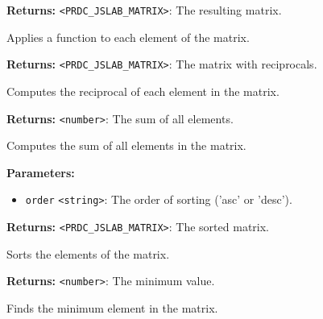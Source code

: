 \documentclass[12pt,a4paper]{article}
\begin{document}
\noindent \textbf{Returns:} \texttt{<PRDC\_JSLAB\_MATRIX>}: The resulting matrix.

\noindent Applies a function to each element of the matrix.

\vspace{5mm}
\noindent {}


\noindent \textbf{Returns:} \texttt{<PRDC\_JSLAB\_MATRIX>}: The matrix with reciprocals.

\noindent Computes the reciprocal of each element in the matrix.

\vspace{5mm}
\noindent {}


\noindent \textbf{Returns:} \texttt{<number>}: The sum of all elements.

\noindent Computes the sum of all elements in the matrix.

\vspace{5mm}
\noindent {}


\noindent \textbf{Parameters:}
\begin{itemize}
  \item \texttt{order} \texttt{<string>}: The order of sorting ('asc' or 'desc').
\end{itemize}

\noindent \textbf{Returns:} \texttt{<PRDC\_JSLAB\_MATRIX>}: The sorted matrix.

\noindent Sorts the elements of the matrix.

\vspace{5mm}
\noindent {}


\noindent \textbf{Returns:} \texttt{<number>}: The minimum value.

\noindent Finds the minimum element in the matrix.

\vspace{5mm}
\noindent {}
\end{document}
